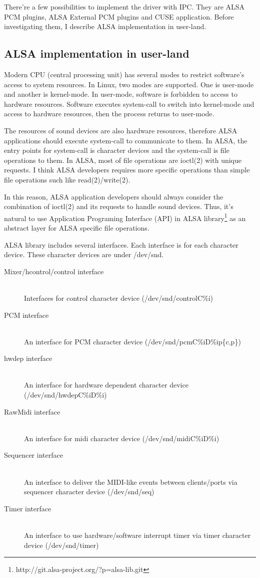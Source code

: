 \documentclass[onecolumn]{article}
\begin{document}
There're a few possibilities to implement the driver with IPC. They are ALSA PCM plugins, ALSA External PCM plugins and CUSE application. Before investigating them, I describe ALSA implementation in user-land.

\subsection{ALSA implementation in user-land}

Modern CPU (central processing unit) has several modes to restrict software's access to system resources. In Linux, two modes are supported. One is user-mode and another is kernel-mode. In user-mode, software is forbidden to access to hardware resources. Software executes system-call to switch into kernel-mode and access to hardware resources, then the process returns to user-mode.

The resources of sound devices are also hardware resources, therefore ALSA applications should execute system-call to communicate to them. In ALSA, the entry points for system-call is character devices and the system-call is file operations to them. In ALSA, most of file operations are ioctl(2) with unique requests. I think ALSA developers requires more specific operations than simple file operations such like read(2)/write(2).

In this reason, ALSA application developers should always consider the combination of ioctl(2) and its requests to handle sound devices. Thus, it's natural to use Application Programing Interface (API) in ALSA library\footnote{http://git.alsa-project.org/?p=alsa-lib.git} as an abstract layer for ALSA specific file operations.

ALSA library includes several interfaces. Each interface is for each character device. These character devices are under /dev/snd.

\begin{description}
\item[Mixer/hcontrol/control interface] \mbox{} \\
Interfaces for control character device (/dev/snd/controlC\%i)
\item[PCM interface] \mbox{} \\
An interface for PCM character device (/dev/snd/pcmC\%iD\%ip\{c,p\})
\item[hwdep interface] \mbox{} \\
An interface for hardware dependent character device (/dev/snd/hwdepC\%iD\%i)
\item[RawMidi interface] \mbox{} \\
An interface for midi character device (/dev/snd/midiC\%iD\%i)
\item[Sequencer interface] \mbox{} \\
An interface to deliver the MIDI-like events between clients/ports via sequencer character device (/dev/snd/seq)
\item[Timer interface] \mbox{} \\
An interface to use hardware/software interrupt timer via timer character device (/dev/snd/timer)
\end{description}
\end{document}
